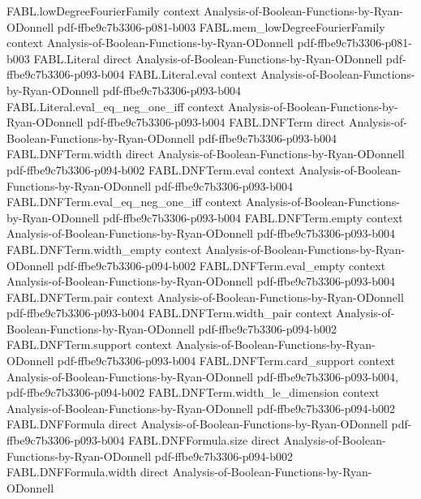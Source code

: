 \begin{theorem}
\proofstep
  {FABL.lowDegreeFourierFamily}
  {context}
  {Analysis-of-Boolean-Functions-by-Ryan-ODonnell}
  {pdf-ffbe9c7b3306-p081-b003}
\proofstep
  {FABL.mem_lowDegreeFourierFamily}
  {context}
  {Analysis-of-Boolean-Functions-by-Ryan-ODonnell}
  {pdf-ffbe9c7b3306-p081-b003}
\proofstep
  {FABL.Literal}
  {direct}
  {Analysis-of-Boolean-Functions-by-Ryan-ODonnell}
  {pdf-ffbe9c7b3306-p093-b004}
\proofstep
  {FABL.Literal.eval}
  {context}
  {Analysis-of-Boolean-Functions-by-Ryan-ODonnell}
  {pdf-ffbe9c7b3306-p093-b004}
\proofstep
  {FABL.Literal.eval_eq_neg_one_iff}
  {context}
  {Analysis-of-Boolean-Functions-by-Ryan-ODonnell}
  {pdf-ffbe9c7b3306-p093-b004}
\proofstep
  {FABL.DNFTerm}
  {direct}
  {Analysis-of-Boolean-Functions-by-Ryan-ODonnell}
  {pdf-ffbe9c7b3306-p093-b004}
\proofstep
  {FABL.DNFTerm.width}
  {direct}
  {Analysis-of-Boolean-Functions-by-Ryan-ODonnell}
  {pdf-ffbe9c7b3306-p094-b002}
\proofstep
  {FABL.DNFTerm.eval}
  {context}
  {Analysis-of-Boolean-Functions-by-Ryan-ODonnell}
  {pdf-ffbe9c7b3306-p093-b004}
\proofstep
  {FABL.DNFTerm.eval_eq_neg_one_iff}
  {context}
  {Analysis-of-Boolean-Functions-by-Ryan-ODonnell}
  {pdf-ffbe9c7b3306-p093-b004}
\proofstep
  {FABL.DNFTerm.empty}
  {context}
  {Analysis-of-Boolean-Functions-by-Ryan-ODonnell}
  {pdf-ffbe9c7b3306-p093-b004}
\proofstep
  {FABL.DNFTerm.width_empty}
  {context}
  {Analysis-of-Boolean-Functions-by-Ryan-ODonnell}
  {pdf-ffbe9c7b3306-p094-b002}
\proofstep
  {FABL.DNFTerm.eval_empty}
  {context}
  {Analysis-of-Boolean-Functions-by-Ryan-ODonnell}
  {pdf-ffbe9c7b3306-p093-b004}
\proofstep
  {FABL.DNFTerm.pair}
  {context}
  {Analysis-of-Boolean-Functions-by-Ryan-ODonnell}
  {pdf-ffbe9c7b3306-p093-b004}
\proofstep
  {FABL.DNFTerm.width_pair}
  {context}
  {Analysis-of-Boolean-Functions-by-Ryan-ODonnell}
  {pdf-ffbe9c7b3306-p094-b002}
\proofstep
  {FABL.DNFTerm.support}
  {context}
  {Analysis-of-Boolean-Functions-by-Ryan-ODonnell}
  {pdf-ffbe9c7b3306-p093-b004}
\proofstep
  {FABL.DNFTerm.card_support}
  {context}
  {Analysis-of-Boolean-Functions-by-Ryan-ODonnell}
  {pdf-ffbe9c7b3306-p093-b004,
    pdf-ffbe9c7b3306-p094-b002}
\proofstep
  {FABL.DNFTerm.width_le_dimension}
  {context}
  {Analysis-of-Boolean-Functions-by-Ryan-ODonnell}
  {pdf-ffbe9c7b3306-p094-b002}
\proofstep
  {FABL.DNFFormula}
  {direct}
  {Analysis-of-Boolean-Functions-by-Ryan-ODonnell}
  {pdf-ffbe9c7b3306-p093-b004}
\proofstep
  {FABL.DNFFormula.size}
  {direct}
  {Analysis-of-Boolean-Functions-by-Ryan-ODonnell}
  {pdf-ffbe9c7b3306-p094-b002}
\proofstep
  {FABL.DNFFormula.width}
  {direct}
  {Analysis-of-Boolean-Functions-by-Ryan-ODonnell}

\end{theorem}
